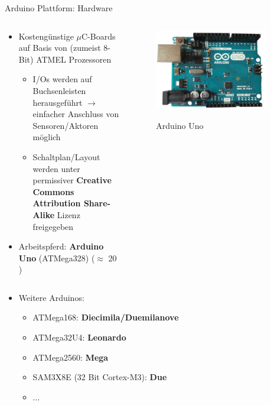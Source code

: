 \documentclass{beamer}
\begin{document}
\begin{frame}{Arduino Plattform: Hardware}
\begin{columns}
 \begin{column}{0.7\textwidth}
 \begin{itemize}
  \item Kosteng\"unstige $\mu$C-Boards auf Basis von (zumeist 8-Bit) ATMEL Prozessoren
  \begin{itemize}
  	\item I/Os werden auf Buchsenleisten herausgef\"uhrt $\rightarrow$ einfacher Anschluss von Sensoren/Aktoren m\"oglich
  	\item Schaltplan/Layout werden unter permissiver \textbf{Creative Commons Attribution Share-Alike} Lizenz freigegeben
  \end{itemize}
 \end{itemize}
 \begin{itemize}
  \item Arbeitspferd: \textbf{Arduino Uno} (ATMega328) ($\approx$ 20 \EUR{}) 
 \end{itemize}
 \end{column}
 \begin{column}{0.3\textwidth}
  \begin{figure}[H]
   \centering
   \includegraphics[width=0.9\textwidth]{./images/arduino-uno.jpg}
   \label{fig:arduino-uno}
   \caption{Arduino Uno\cite{Image:ArduinoUno}}
  \end{figure}
 \end{column}
\end{columns}
 \begin{itemize}
 	\item Weitere Arduinos:
 	\begin{itemize}
 		\item ATMega168: \textbf{Diecimila/Duemilanove}
 		\item ATMega32U4: \textbf{Leonardo}
 		\item ATMega2560: \textbf{Mega} 
 		\item SAM3X8E (32 Bit Cortex-M3): \textbf{Due}
 		\item ...
 	\end{itemize}
 \end{itemize}
\end{frame}
\end{document}
